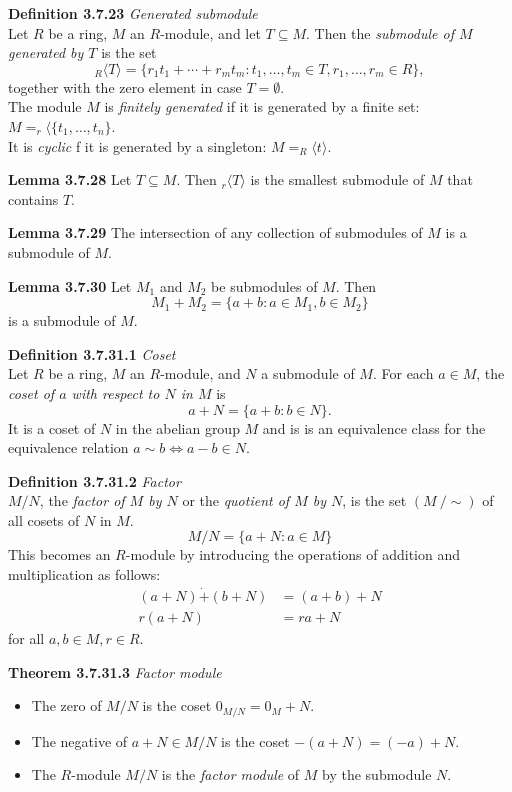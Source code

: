 \documentclass[8pt,landscape]{article}
\begin{document}
\begin{multicols}{3}
    \textbf{Definition 3.7.23} \emph{Generated submodule} \\
    Let $R$ be a ring, $M$ an $R$-module, and let $T \subseteq M$.
    Then the \emph{submodule of $M$ generated by $T$} is the set
    \[
        _R \langle T \rangle = \{{r_1}{t_1} + \cdots + {r_m}{t_m} : t_1, \ldots, t_m
        \in T, r_1, \ldots, r_m \in R \},
    \]
    together with the zero element in case $T = \emptyset$.\\
    The module $M$ is \emph{finitely generated} if it is generated by a finite set:
    $M = _r \langle \{ t_1, \ldots, t_n \}$. \\
    It is \emph{cyclic} f it is generated by a singleton:
    $M = _R \langle t \rangle$.

    \textbf{Lemma 3.7.28} Let $T \subseteq M$. Then $_r \langle T \rangle$
    is the smallest submodule of $M$ that contains $T$.

    \textbf{Lemma 3.7.29} The intersection of any collection of submodules of $M$ is a
    submodule of $M$.

    \textbf{Lemma 3.7.30} Let $M_1$ and $M_2$ be submodules of $M$.
    Then
    \[
        M_1 + M_2 = \{ a + b : a \in M_1, b \in M_2 \}
    \]
    is a submodule of $M$.

    \textbf{Definition 3.7.31.1} \emph{Coset} \\
    Let $R$ be a ring, $M$ an $R$-module, and $N$ a submodule of $M$.
    For each $a \in M$, the \emph{coset of $a$ with respect to $N$ in $M$} is
    \[
        a + N = \{ a + b : b \in N \}.
    \]
    It is a coset of $N$ in the abelian group $M$ and is is an equivalence class for the
    equivalence relation $a \sim b \iff a-b \in N$.

    \textbf{Definition 3.7.31.2} \emph{Factor} \\
    $M/N$, the \emph{factor of $M$ by $N$} or the \emph{quotient of $M$ by $N$},
    is the set $(M \ / \sim)$ of all cosets of $N$ in $M$.
    \[
        M/N = \{ a + N : a \in M \}
    \]
    This becomes an $R$-module by introducing the operations of addition and
    multiplication as follows:
    \begin{align*}{}
        (a + N) \dot{+} (b + N) & = (a + b) + N \\
        r(a + N)                & = ra + N
    \end{align*}
    for all $a, b \in M, r \in R$.

    \textbf{Theorem 3.7.31.3} \emph{Factor module}
    \begin{itemize}
        \item The zero of $M/N$ is the coset $0_{M/N} = 0_M + N$.
        \item The negative of $a + N \in M/N$ is the coset $-(a+N) = (-a)+N$.
        \item The $R$-module $M/N$ is the \emph{factor module} of $M$ by the submodule
            $N$.
    \end{itemize}


\end{multicols}
\end{document}
